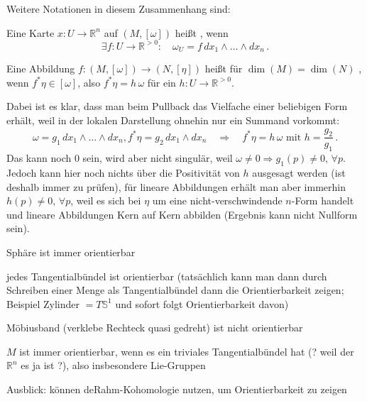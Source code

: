 \documentclass[../H_Analysis_main.tex]{subfiles}
\begin{document}
Weitere Notationen in diesem Zusammenhang sind:
\begin{defi}
Eine Karte $x: U \rightarrow \mathbb{R}^n$ auf $(M, [\omega])$ heißt , wenn
\begin{equation}
\exists f: U \rightarrow \mathbb{R}^{> 0}: \quad \omega_U = f \, dx_1 \wedge \dots \wedge dx_n \, .
\end{equation}

Eine Abbildung $f: (M, [\omega]) \rightarrow (N, [\eta])$ heißt für $\dim(M) = \dim(N)$ , wenn $f^* \eta \in [\omega]$, also $f^* \eta = h \, \omega$ für ein $h: U \rightarrow \mathbb{R}^{> 0}$.
\end{defi}

Dabei ist es klar, dass man beim Pullback das Vielfache einer beliebigen Form erhält, weil in der lokalen Darstellung ohnehin nur ein Summand vorkommt:
\begin{equation}
\omega = g_1 \, dx_1 \wedge \dots \wedge dx_n, f^*\eta = g_2 \, dx_1 \wedge dx_n \quad \Rightarrow \quad f^*\eta = h \, \omega \text{ mit } h = \frac{g_2}{g_1} \, .
\end{equation}
Das kann noch 0 sein, wird aber nicht singulär, weil $\omega \neq 0 \Rightarrow g_1(p) \neq 0, \, \forall p$. Jedoch kann hier noch nichts über die Positivität von $h$ ausgesagt werden (ist deshalb immer zu prüfen), für lineare Abbildungen erhält man aber immerhin $h(p) \neq 0, \, \forall p$, weil es sich bei $\eta$ um eine nicht-verschwindende $n$-Form handelt und lineare Abbildungen Kern auf Kern abbilden (Ergebnis kann nicht Nullform sein).


\begin{bsp}
Sphäre ist immer orientierbar

jedes Tangentialbündel ist orientierbar (tatsächlich kann man dann durch Schreiben einer Menge als Tangentialbündel dann die Orientierbarkeit zeigen; Beispiel Zylinder $= T\mathbb{S}^1$ und sofort folgt Orientierbarkeit davon)

Möbiusband (verklebe Rechteck quasi gedreht) ist nicht orientierbar

$M$ ist immer orientierbar, wenn es ein triviales Tangentialbündel hat (? weil der $\mathbb{R}^n$ es ja ist ?), also insbesondere Lie-Gruppen


Ausblick: können deRahm-Kohomologie nutzen, um Orientierbarkeit zu zeigen
\end{bsp}
\end{document}
